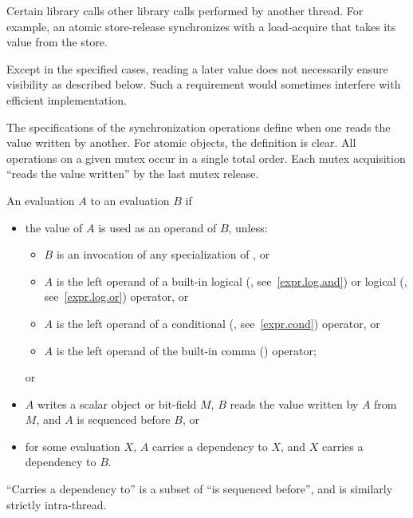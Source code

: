 \pnum
Certain library calls  other library calls performed by
another thread. For example, an atomic store-release synchronizes with a
load-acquire that takes its value from the store.
\begin{note}
Except in the specified cases, reading a later value does not
necessarily ensure visibility as described below. Such a requirement would
sometimes interfere with efficient implementation.
\end{note}
\begin{note}
The
specifications of the synchronization operations define when one reads the value
written by another. For atomic objects, the definition is clear. All operations
on a given mutex occur in a single total order. Each mutex acquisition ``reads
the value written'' by the last mutex release.
\end{note}

\pnum
An evaluation $A$  to an evaluation $B$ if
\begin{itemize}
\item
the value of $A$ is used as an operand of $B$, unless:
\begin{itemize}
\item
$B$ is an invocation of any specialization of
, or
\item
$A$ is the left operand of a built-in logical  (\tcode{\&\&},
see~\ref{expr.log.and}) or logical  (\tcode{||}, see~\ref{expr.log.or})
operator, or
\item
$A$ is the left operand of a conditional (, see~\ref{expr.cond})
operator, or
\item
$A$ is the left operand of the built-in comma (\tcode{,})
operator; \end{itemize} or
\item
$A$ writes a scalar object or bit-field $M$, $B$ reads the value
written by $A$ from $M$, and $A$ is sequenced before $B$, or
\item
for some evaluation $X$, $A$ carries a dependency to $X$, and
$X$ carries a dependency to $B$.
\end{itemize}
\begin{note}
``Carries a dependency to'' is a subset of ``is sequenced before'',
and is similarly strictly intra-thread.
\end{note}

